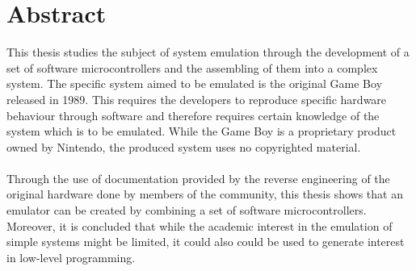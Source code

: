 
\thispagestyle{plain}			%
\setlength{\parskip}{0pt plus 1.0pt}
\section*{\centering Abstract}
This thesis studies the subject of system emulation through the development of a set of software microcontrollers and the assembling of them into a complex system. The specific system aimed to be emulated is the original Game Boy released in 1989. This requires the developers to reproduce specific hardware behaviour through software and therefore requires certain knowledge of the system which is to be emulated. While the Game Boy is a proprietary product owned by Nintendo, the produced system uses no copyrighted material. %
\\\\
Through the use of documentation provided by the reverse engineering of the original hardware done by members of the community, this thesis shows that an emulator can be created by combining a set of software microcontrollers. Moreover, it is concluded that while the academic interest in the emulation of simple systems might be limited, it could also could be used to generate interest in low-level programming.


